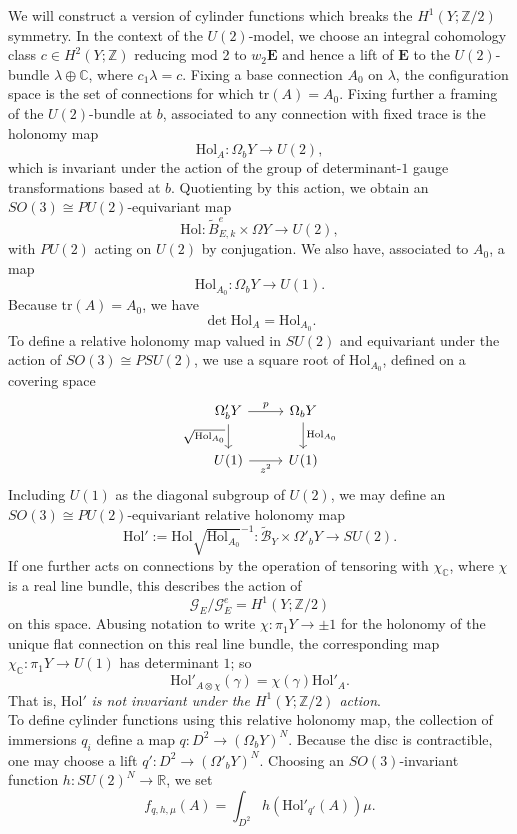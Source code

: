 \documentclass[10pt,a4paper]{amsart}
\theoremstyle{definition}
\theoremstyle{remark}
\numberwithin{figure}{qchap}
\begin{document}
We will construct a version of cylinder functions which breaks the $H^1(Y; \mathbb Z/2)$ symmetry. In the context of the $U(2)$-model, we choose an integral cohomology class $c \in H^2(Y;\mathbb Z)$ reducing mod 2 to $w_2 \mathbf{E}$ and hence a lift of $\mathbf{E}$ to the $U(2)$-bundle $\lambda \oplus \mathbb C$, where $c_1 \lambda = c$. Fixing a base connection $A_0$ on $\lambda$, the configuration space is the set of connections for which $\text{tr}(A) = A_0$. Fixing further a framing of the $U(2)$-bundle at $b$, associated to any connection with fixed trace is the holonomy map 
$$\text{Hol}_A: \Omega_b Y \to U(2),$$
which is invariant under the action of the group of determinant-$1$ gauge transformations based at $b$. Quotienting by this action, we obtain an $SO(3) \cong PU(2)$-equivariant map \[\text{Hol}: \widetilde B^e_{E,k} \times \Omega Y \to U(2),\] with $PU(2)$ acting on $U(2)$ by conjugation. We also have, associated to $A_0$, a map 
$$\text{Hol}_{A_0}: \Omega_b Y \to U(1).$$ 
Because $\text{tr}(A) = A_0$, we have 
$$\det \text{Hol}_A = \text{Hol}_{A_0}.$$ 
To define a relative holonomy map valued in $SU(2)$ and equivariant under the action of $SO(3) \cong PSU(2)$, we use a square root of $\text{Hol}_{A_0}$, defined on a covering space 
\[\begin{tikzcd}
	{\Omega'_b Y} & {\Omega_b Y} \\
	{U(1)} & {U(1)}
	\arrow["p", from=1-1, to=1-2]
	\arrow["{\sqrt{\text{Hol}_{A_0}}}"', from=1-1, to=2-1]
	\arrow["{\text{Hol}_{A_0}}", from=1-2, to=2-2]
	\arrow["{z^2}"', from=2-1, to=2-2]
\end{tikzcd}\]
Including $U(1)$ as the diagonal subgroup of $U(2)$, we may define an $SO(3) \cong PU(2)$-equivariant relative holonomy map 
$$\text{Hol}' := \text{Hol} \sqrt{\text{Hol}_{A_0}}^{-1}: \widetilde{\mathcal B}_Y \times \Omega'_b Y \to SU(2).$$ 
If one further acts on connections by the operation of tensoring with $\chi_{\mathbb C}$, where $\chi$ is a real line bundle, this describes the action of 
$$\mathcal G_E/\mathcal G^e_E = H^1(Y;\mathbb Z/2)$$ 
on this space. Abusing notation to write $\chi: \pi_1 Y \to \pm 1$ for the holonomy of the unique flat connection on this real line bundle, the corresponding map $\chi_{\mathbb C}: \pi_1 Y \to U(1)$ has determinant $1$; so 
$$\text{Hol}'_{A \otimes \chi}(\gamma) = \chi(\gamma) \text{Hol}'_A.$$
That is, $\text{Hol}'$ \emph{is not invariant under the $H^1(Y;\mathbb Z/2)$ action}.\\

To define cylinder functions using this relative holonomy map, the collection of immersions $q_i$ define a map $q: D^2 \to (\Omega_b Y)^N$. Because the disc is contractible, one may choose a lift $q': D^2 \to (\Omega'_b Y)^N$. Choosing an $SO(3)$-invariant function $h: SU(2)^N \to \mathbb R$, we set \[f_{q,h,\mu}(A) = \int_{D^2} h(\text{Hol}'_{q'}(A)) \mu.\] 
\end{document}
